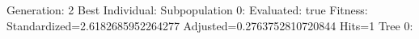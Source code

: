 \documentclass[]{article}
\begin{document}
Generation: 2
Best Individual:
Subpopulation 0:
Evaluated: true
Fitness: Standardized=2.6182685952264277 Adjusted=0.2763752810720844 Hits=1
Tree 0:
\begin{bundle}{\gpbox{+}}\end{bundle}
\end{document}
